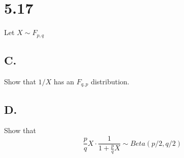 \section*{5.17}

Let $X \sim F_{p,q}$




\subsection*{C.}

Show that $1/X$ has an $F_{q,p}$ distribution.

\subsection*{D.}

Show that 
\[\frac{p}{q}X \cdot \frac{1}{1+\frac{p}{q}X} \sim Beta(p/2, q/2)\]

